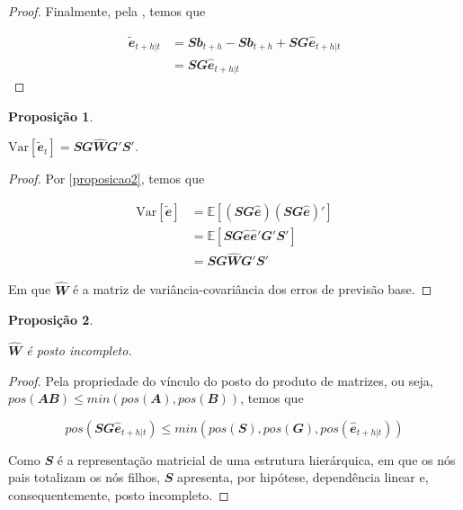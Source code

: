 \documentclass[
  12pt,
  twoside,
  openright,
  a4paper,
  chapter=TITLE,
  section=TITLE,
  brazil]{abntex2}
\newtheorem{proposition}{Proposição}[chapter]
\begin{document}
\begin{apendicesenv}
\begin{proof}
  Finalmente, pela , temos que

  \begin{align}
    \mathbfit{\tilde{e}}_{t+h|t} &=  \mathbfit{Sb}_{t+h} - \mathbfit{Sb}_{t+h}  + \mathbfit{SG\hat{e}}_{t+h|t}  \\
    &= \mathbfit{SG\hat{e}}_{t+h|t}
  \end{align}
\end{proof}

\begin{proposition}
  \label{proposicao3}

  $\text{Var}[\mathbfit{\tilde{e}}_t] = \mathbfit{SG\hat{W}G'S'}$.

\end{proposition}

\begin{proof}
  Por \ref{proposicao2}, temos que

  \begin{align}
    \text{Var}[\mathbfit{\tilde{e}}] &= \mathbb{E}[\mathbfit{(SG\hat{e})(SG\hat {e})'}] \\
    &= \mathbb{E}[\mathbfit{SG\hat{e}\hat{e}'G'S'}] \\
    &= \mathbfit{SG\hat{W}G'S'}
  \end{align}

  Em que $\mathbfit{\hat{W}}$ é a matriz de variância-covariância dos erros de  previsão base.
\end{proof}

\begin{proposition}
  \label{proposicao4}

  $\mathbfit{\hat{W}}$ é posto incompleto.

\end{proposition}

\begin{proof}
  Pela propriedade do vínculo do posto do produto de matrizes, ou seja, $pos(\mathbfit{AB}) \leq min(pos(\mathbfit{A}), pos(\mathbfit{B}))$, temos que
  
  \begin{equation}
    pos(\mathbfit{SG\hat{e}}_{t+h|t}) \leq min(pos(\mathbfit{S}), pos(\mathbfit{G}), pos(\mathbfit{\hat{e}}_{t+h|t})) \label{eq:ap_a_4_1}
  \end{equation}

  Como $\mathbfit{S}$ é a representação matricial de uma estrutura hierárquica, em que os nós pais totalizam os nós filhos, $\mathbfit{S}$ apresenta, por hipótese, dependência linear e, consequentemente, posto incompleto.


\end{proof}
\end{apendicesenv}
\end{document}
